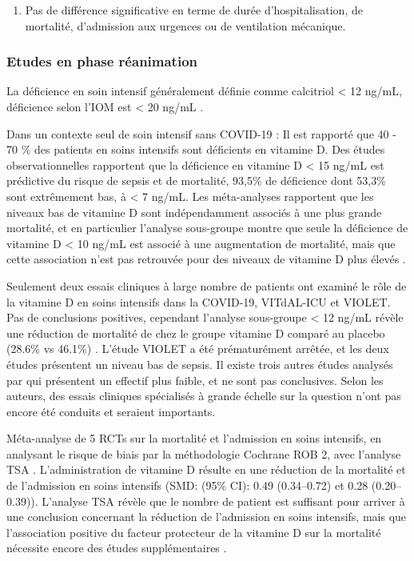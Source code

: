 \documentclass[
  a4paper,
  DIV=11,
  numbers=noendperiod,
  listof=totoc]{scrreprt}
\providecommand{\tightlist}{%
  \setlength{\itemsep}{0pt}\setlength{\parskip}{0pt}}\usepackage{longtable,booktabs,array}
\begin{document}
\begin{enumerate}
\def\labelenumi{\arabic{enumi}.}
\setcounter{enumi}{119}
\tightlist
\item
  Pas de différence significative en terme de durée d'hospitalisation,
  de mortalité, d'admission aux urgences ou de ventilation mécanique.
\end{enumerate}

\subsubsection{Etudes en phase
réanimation}\label{etudes-en-phase-ruxe9animation}

La déficience en soin intensif généralement définie comme calcitriol
\textless{} 12 ng/mL, déficience selon l'IOM est \textless{} 20 ng/mL
\autocite{Cutuli.2024}.

Dans un contexte seul de soin intensif sans COVID-19 : Il est rapporté
que 40 - 70 \% des patients en soins intensifs sont déficients en
vitamine D. Des études observationnelles rapportent que la déficience en
vitamine D \textless{} 15 ng/mL est prédictive du risque de sepsis et de
mortalité, 93,5\% de déficience dont 53,3\% sont extrêmement bas, à
\textless{} 7 ng/mL. Les méta-analyses rapportent que les niveaux bas de
vitamine D sont indépendamment associés à une plus grande mortalité, et
en particulier l'analyse sous-groupe montre que seule la déficience de
vitamine D \textless{} 10 ng/mL est associé à une augmentation de
mortalité, mais que cette association n'est pas retrouvée pour des
niveaux de vitamine D plus élevés \autocite{Cutuli.2024}.

Seulement deux essais cliniques à large nombre de patients ont examiné
le rôle de la vitamine D en soins intensifs dans la COVID-19, VITdAL-ICU
et VIOLET. Pas de conclusions positives, cependant l'analyse sous-groupe
\textless{} 12 ng/mL révèle une réduction de mortalité de chez le groupe
vitamine D comparé au placebo (28.6\% vs 46.1\%) \autocite{Cutuli.2024}.
L'étude VIOLET a été prématurément arrêtée, et les deux études
présentent un niveau bas de sepsis. Il existe trois autres études
analysés par \textcite{Cutuli.2024} qui présentent un effectif plus
faible, et ne sont pas conclusives. Selon les auteurs, des essais
cliniques spécialisés à grande échelle sur la question n'ont pas encore
été conduits et seraient importants.

Méta-analyse de 5 \acp{RCT} sur la mortalité et l'admission en soins
intensifs, en analysant le risque de biais par la méthodologie Cochrane
ROB 2, avec l'analyse \ac{TSA} \autocite{Kang.2021}. L'administration de
vitamine D résulte en une réduction de la mortalité et de l'admission en
soins intensifs (SMD: (95\% CI): 0.49 (0.34--0.72) et 0.28
(0.20--0.39)). L'analyse TSA révèle que le nombre de patient est
suffisant pour arriver à une conclusion concernant la réduction de
l'admission en soins intensifs, mais que l'association positive du
facteur protecteur de la vitamine D sur la mortalité nécessite encore
des études supplémentaires \autocite{Argano.2023}.
\end{document}
